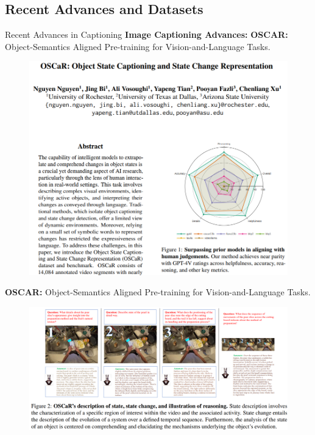 \subsection{Recent Advances and Datasets}
\begin{frame}[allowframebreaks]{Recent Advances in Captioning}
    \textbf{Image Captioning Advances:}
\framebreak
    \textbf{OSCAR:} Object-Semantics Aligned Pre-training for Vision-and-Language Tasks.
    \begin{figure}
        \centering
        \includegraphics[width=1\textwidth,height=0.7\textheight,keepaspectratio]{images/vision+text/captioning-oscar.png}
    \end{figure}
\framebreak
    \textbf{OSCAR:} Object-Semantics Aligned Pre-training for Vision-and-Language Tasks.
    \begin{figure}
        \centering
        \includegraphics[width=1\textwidth,height=0.8\textheight,keepaspectratio]{images/vision+text/captioning-oscar-2.png}

\end{figure}
\end{frame}
